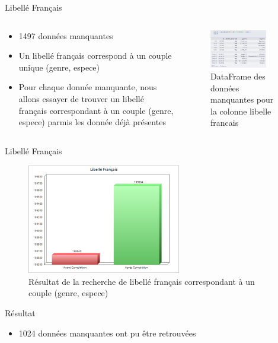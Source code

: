 \documentclass{beamer}
\begin{document}
\begin{frame}{Libellé Français}
	\begin{columns}
	\begin{column}{0.7\textwidth}
		\begin{itemize}
			\item 1497 données manquantes
			\item Un libellé français correspond à un couple unique (genre, espece)
			\item Pour chaque donnée manquante, nous allons essayer de trouver un libellé français correspondant à un couple (genre, espece) parmis les donnée déjà présentes
		\end{itemize}
	\end{column}
	\begin{column}{0.3\textwidth}
		\begin{figure}
			\includegraphics[width=0.8\textwidth,keepaspectratio]{ressources/df_libfr(1).png}
				\caption{DataFrame des données manquantes pour la colonne libelle francais}
		\end{figure}
	\end{column}
	\end{columns}
\end{frame}
\begin{frame}{Libellé Français}
	\begin{figure}
		\includegraphics[width=0.6\textwidth,keepaspectratio]{ressources/libfrancais.png}
			\caption{Résultat de la recherche de libellé français correspondant à un couple (genre, espece)}
	\end{figure}
	{
	\begin{block}{Résultat}
		\begin{itemize}
			\item 1024 données manquantes ont pu être retrouvées
		\end{itemize}
	\end{block}
	}
\end{frame}
\end{document}
